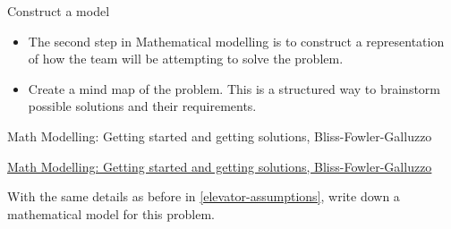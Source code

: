 \newpage


%
%



\begin{module}{Construct a model}
	\label{model}

	
	
\end{module}



\begin{lesson}

	\begin{itemize}
		\item The second step in Mathematical modelling is to construct a representation of how the team will be attempting to solve the problem.
		\item Create a mind map of the problem. This is a structured way to brainstorm possible solutions and their requirements.
	\end{itemize}
	

\begin{annotation}
	\begin{goals}
	Math Modelling: Getting started and getting solutions, Bliss-Fowler-Galluzzo
	
	\hfill {}	
	\end{goals}
\end{annotation}
	 \href{https://m3challenge.siam.org/resources/modeling-handbook}{Math Modelling: Getting started and getting solutions, Bliss-Fowler-Galluzzo}

\end{lesson}




\newpage

\question

With the same details as before in \ref{elevator-assumptions}, write down a mathematical model for this problem.
















